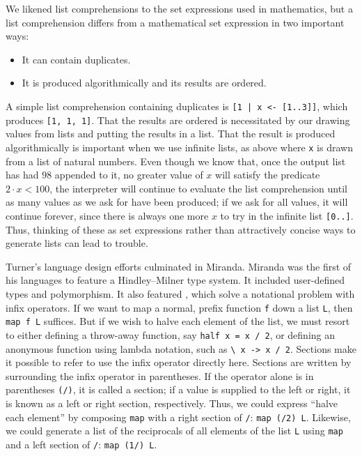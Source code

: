 We likened list comprehensions to the set expressions used in mathematics, but a list comprehension differs from a mathematical set expression in two important ways:
\begin{itemize}
\item
It can contain duplicates.
\item
It is produced algorithmically and its results are ordered.
\end{itemize}
A simple list comprehension containing duplicates is \lstinline{[1 | x <- [1..3]]}, which produces \lstinline{[1, 1, 1]}. That the results are ordered is necessitated by our drawing values from lists and putting the results in a list. That the result is produced algorithmically is important when we use infinite lists, as above where \lstinline{x} is drawn from a list of natural numbers. Even though we know that, once the output list has had $98$ appended to it, no greater value of $x$ will satisfy the predicate $2\cdot x < 100$, the interpreter will continue to evaluate the list comprehension until as many values as we ask for have been produced; if we ask for all values, it will continue forever, since there is always one more $x$ to try in the infinite list \lstinline{[0..]}. Thus, thinking of these as set expressions rather than attractively concise ways to generate lists can lead to trouble.

Turner's language design efforts culminated in Miranda. Miranda was the first of his languages to feature a Hindley--Milner type system. It included user-defined types and polymorphism. It also featured , which solve a notational problem with infix operators. If we want to map a normal, prefix function \lstinline{f} down a list \lstinline{L}, then \lstinline{map f L} suffices. But if we wish to halve each element of the list, we must resort to either defining a throw-away function, say \lstinline{half x = x / 2}, or defining an anonymous function using lambda notation, such as \lstinline{\ x -> x / 2}. Sections make it possible to refer to use the infix operator directly here. Sections are written by surrounding the infix operator in parentheses. If the operator alone is in parentheses \lstinline{(/)}, it is called a section; if a value is supplied to the left or right, it is known as a left or right section, respectively. Thus, we could express ``halve each element'' by composing \lstinline{map} with a right section of \lstinline{/}: \lstinline{map (/2) L}. Likewise, we could generate a list of the reciprocals of all elements of the list \lstinline{L} using \lstinline{map} and a left section of \lstinline{/}: \lstinline{map (1/) L}.

